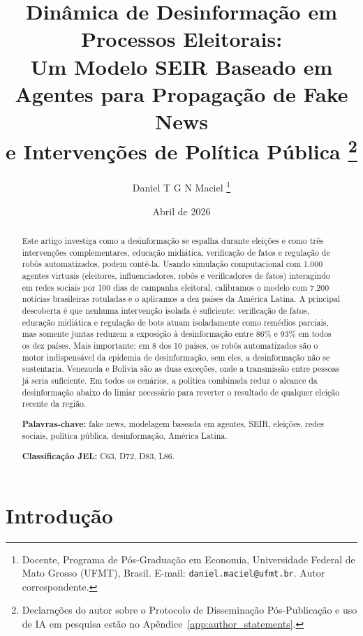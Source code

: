 \documentclass[12pt,a4paper]{article}
\title{Dinâmica de Desinformação em Processos Eleitorais:\\
Um Modelo SEIR Baseado em Agentes para Propagação de Fake News\\
e Intervenções de Política Pública%
\thanks{Declarações do autor sobre o Protocolo de Disseminação Pós-Publicação e uso de IA em pesquisa estão no Apêndice~\ref{app:author_statements}.}}
\author{
    Daniel T G N Maciel%
    \thanks{Docente, Programa de Pós-Graduação em Economia, Universidade Federal de Mato Grosso (UFMT), Brasil. E-mail: \texttt{daniel.maciel@ufmt.br}. Autor correspondente.}
}
\date{Abril de 2026}
\theoremstyle{definition}
\theoremstyle{plain}
\begin{document}
\maketitle

\begin{abstract}
Este artigo investiga como a desinformação se espalha durante eleições e como três intervenções complementares, educação midiática, verificação de fatos e regulação de robôs automatizados, podem contê-la. Usando simulação computacional com 1.000 agentes virtuais (eleitores, influenciadores, robôs e verificadores de fatos) interagindo em redes sociais por 100 dias de campanha eleitoral, calibramos o modelo com 7.200 notícias brasileiras rotuladas e o aplicamos a dez países da América Latina. A principal descoberta é que nenhuma intervenção isolada é suficiente: verificação de fatos, educação midiática e regulação de bots atuam isoladamente como remédios parciais, mas somente juntas reduzem a exposição à desinformação entre 86\% e 93\% em todos os dez países. Mais importante: em 8 dos 10 países, os robôs automatizados são o motor indispensável da epidemia de desinformação, sem eles, a desinformação não se sustentaria. Venezuela e Bolívia são as duas exceções, onde a transmissão entre pessoas já seria suficiente. Em todos os cenários, a política combinada reduz o alcance da desinformação abaixo do limiar necessário para reverter o resultado de qualquer eleição recente da região.

\vspace{0.3cm}
\noindent\textbf{Palavras-chave:} fake news, modelagem baseada em agentes, SEIR, eleições, redes sociais, política pública, desinformação, América Latina.

\vspace{0.2cm}
\noindent\textbf{Classificação JEL:} C63, D72, D83, L86.
\end{abstract}

\section{Introdução}
\label{sec:intro}
\end{document}
